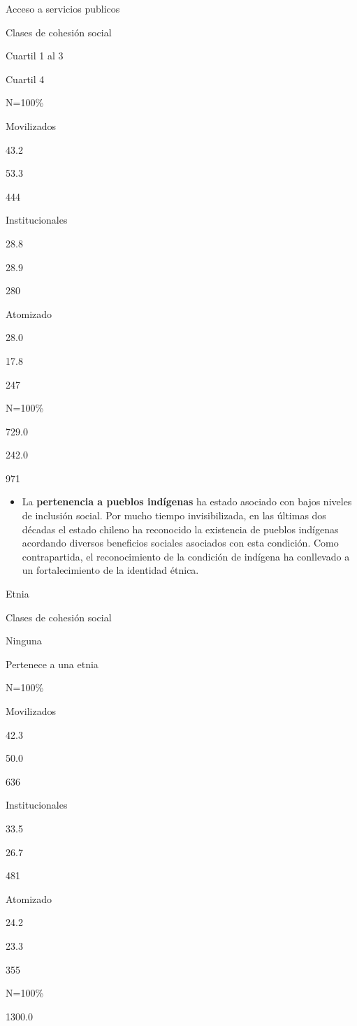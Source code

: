 \documentclass[
  12pt,
]{book}
\providecommand{\tightlist}{%
  \setlength{\itemsep}{0pt}\setlength{\parskip}{0pt}}
\begin{document}
Acceso a servicios publicos

Clases de cohesión social

Cuartil 1 al 3

Cuartil 4

N=100\%

Movilizados

43.2

53.3

444

Institucionales

28.8

28.9

280

Atomizado

28.0

17.8

247

N=100\%

729.0

242.0

971

\begin{itemize}
\tightlist
\item
  La \textbf{pertenencia a pueblos indígenas} ha estado asociado con bajos niveles de inclusión social. Por mucho tiempo invisibilizada, en las últimas dos décadas el estado chileno ha reconocido la existencia de pueblos indígenas acordando diversos beneficios sociales asociados con esta condición. Como contrapartida, el reconocimiento de la condición de indígena ha conllevado a un fortalecimiento de la identidad étnica.
\end{itemize}

Etnia

Clases de cohesión social

Ninguna

Pertenece a una etnia

N=100\%

Movilizados

42.3

50.0

636

Institucionales

33.5

26.7

481

Atomizado

24.2

23.3

355

N=100\%

1300.0
\end{document}
